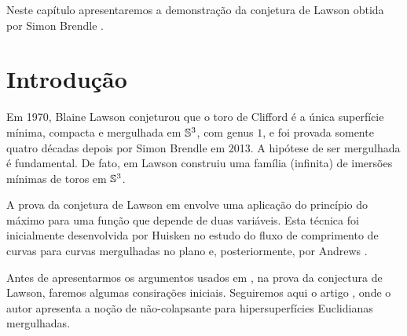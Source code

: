 %	
%	
%	
%	


Neste capítulo apresentaremos a demonstração da conjetura de
Lawson obtida por Simon Brendle \cite{Brendle2013a}.


\section{Introdu\c c\~ao}

Em 1970, Blaine Lawson \cite{Lawson1970a} conjeturou que o toro de 
Clifford é a única superfície mínima, compacta e mergulhada em $\mathbb{S}^3$,
com genus $1$, e foi provada somente quatro décadas depois por Simon
Brendle \cite{Brendle2013a} em 2013. A hipótese de ser mergulhada é
fundamental. De fato, em \cite{Lawson1970} Lawson construiu uma 
família (infinita) de imersões mínimas de toros em $\mathbb{S}^3$.

A prova da conjetura de Lawson em \cite{Brendle2013a} envolve uma 
aplicação do princípio do máximo para uma função que depende de 
duas vari\'aveis. Esta técnica foi inicialmente desenvolvida por Huisken
\cite{Huisken1998} no estudo do fluxo de comprimento de curvas para 
curvas mergulhadas no plano e, posteriormente, por Andrews 
\cite{Andrews2012}.

Antes de apresentarmos os argumentos usados em \cite{Brendle2013a},
na prova da conjectura de Lawson, faremos algumas consira\c c\~oes
iniciais. Seguiremos aqui o artigo \cite{Andrews2012}, onde o autor
apresenta a no\c c\~ao de n\~ao-colapsante para hipersuperf\'icies
Euclidianas mergulhadas.

